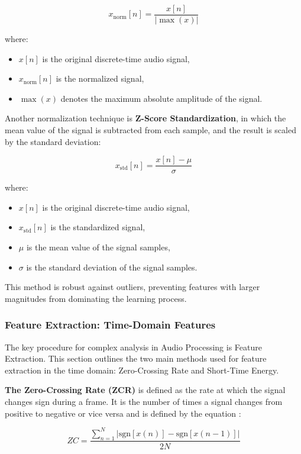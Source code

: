 \documentclass[11pt, a4paper, twoside]{article}
\begin{document}
\begin{equation}
x_{\text{norm}}[n] = \frac{x[n]}{\left| \max(x) \right|}
\end{equation}

where:
\begin{itemize}
\item $x[n]$ is the original discrete-time audio signal,
\item $x_{\text{norm}}[n]$ is the normalized signal,
\item $\max(x)$ denotes the maximum absolute amplitude of the signal.
\end{itemize}

Another normalization technique is \textbf{Z-Score Standardization}, in which the mean value of the signal is subtracted from each sample, and the result is scaled by the standard deviation:

\begin{equation}
x_{\text{std}}[n] = \frac{x[n] - \mu}{\sigma}
\end{equation}

where:
\begin{itemize}
\item $x[n]$ is the original discrete-time audio signal,
\item $x_{\text{std}}[n]$ is the standardized signal,
\item $\mu$ is the mean value of the signal samples,
\item $\sigma$ is the standard deviation of the signal samples.
\end{itemize}

This method is robust against outliers, preventing features with larger magnitudes from dominating the learning process.

\subsubsection{Feature Extraction: Time-Domain Features}
The key procedure for complex analysis in Audio Processing is Feature Extraction. This section outlines the two main methods used for feature extraction in the time domain: Zero-Crossing Rate and Short-Time Energy.

\textbf{The Zero-Crossing Rate (ZCR)} is defined as the rate at which the signal changes sign during a frame. It is the number of times a signal changes from positive to negative or vice versa and is defined by the equation \cite{babaee2017overview}:

\begin{equation}
ZC = \frac{\sum_{n=1}^{N} \left| \mathrm{sgn}[x(n)] - \mathrm{sgn}[x(n-1)] \right|}{2N}
\label{eq:zcr}
\end{equation}
\end{document}
